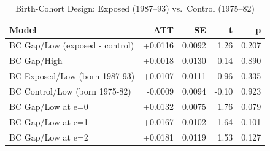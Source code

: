 \begin{table}[ht]
\centering
\begin{tabular}{lrrrr}
  \toprule
Model & ATT & SE & t & p \\ 
  \midrule
BC Gap/Low (exposed - control) & +0.0116 & 0.0092 & 1.26 & 0.207 \\ 
  BC Gap/High & +0.0018 & 0.0130 & 0.14 & 0.890 \\ 
  BC Exposed/Low (born 1987-93) & +0.0107 & 0.0111 & 0.96 & 0.335 \\ 
  BC Control/Low (born 1975-82) & -0.0009 & 0.0094 & -0.10 & 0.923 \\ 
  BC Gap/Low at e=0 & +0.0132 & 0.0075 & 1.76 & 0.079 \\ 
  BC Gap/Low at e=1 & +0.0167 & 0.0102 & 1.64 & 0.101 \\ 
  BC Gap/Low at e=2 & +0.0181 & 0.0119 & 1.53 & 0.127 \\ 
   \bottomrule
\end{tabular}
\caption{Birth-Cohort Design: Exposed (1987--93) vs.\ Control (1975--82)} 
\label{tab:birthcohort}
\end{table}
